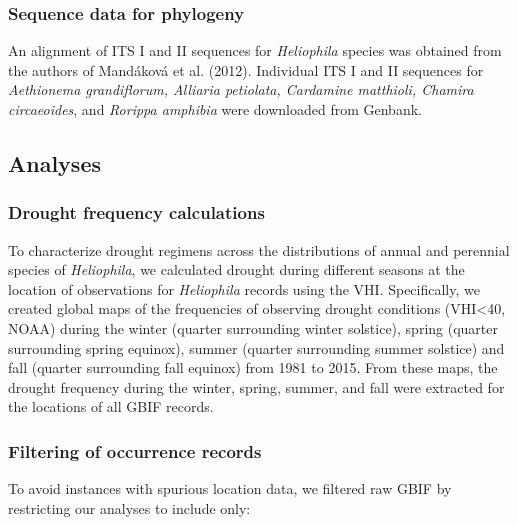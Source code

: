 \documentclass[man,floatsintext]{apa6}
\theoremstyle{definition}
\theoremstyle{definition}
\theoremstyle{definition}
\theoremstyle{remark}
\begin{document}
\hypertarget{sequence-data-for-phylogeny}{%
\subsubsection{Sequence data for
phylogeny}\label{sequence-data-for-phylogeny}}

An alignment of ITS I and II sequences for \emph{Heliophila} species was
obtained from the authors of Mandáková et al. (2012). Individual ITS I
and II sequences for \emph{Aethionema grandiflorum, Alliaria petiolata,
Cardamine matthioli, Chamira circaeoides}, and \emph{Rorippa amphibia}
were downloaded from Genbank.

\hypertarget{analyses}{%
\subsection{Analyses}\label{analyses}}

\hypertarget{drought-frequency-calculations}{%
\subsubsection{Drought frequency
calculations}\label{drought-frequency-calculations}}

To characterize drought regimens across the distributions of annual and
perennial species of \emph{Heliophila}, we calculated drought during
different seasons at the location of observations for \emph{Heliophila}
records using the VHI. Specifically, we created global maps of the
frequencies of observing drought conditions (VHI\textless{}40, NOAA)
during the winter (quarter surrounding winter solstice), spring (quarter
surrounding spring equinox), summer (quarter surrounding summer
solstice) and fall (quarter surrounding fall equinox) from 1981 to 2015.
From these maps, the drought frequency during the winter, spring,
summer, and fall were extracted for the locations of all GBIF records.

\hypertarget{filtering-of-occurrence-records}{%
\subsubsection{Filtering of occurrence
records}\label{filtering-of-occurrence-records}}

To avoid instances with spurious location data, we filtered raw GBIF by
restricting our analyses to include only:
\end{document}
